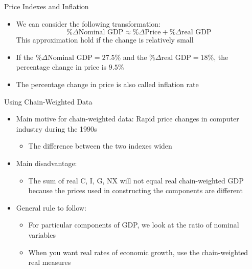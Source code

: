 \documentclass[aspectratio=1610]{beamer}
\begin{document}
\begin{frame}[wide]{Price Indexes and Inflation}
	\begin{itemize}
		\item We can consider the following transformation:
		\[\%\Delta \mbox{Nominal GDP} \approx \%\Delta \mbox{Price}+ \%\Delta \mbox{real GDP}\]
		This approximation hold if the change is relatively small
		\item If the $\%\Delta \mbox{Nominal GDP} = 27.5\%$ and the $\%\Delta \mbox{real GDP} = 18\%$, the percentage change in price is $9.5\%$
		\item The percentage change in price is also called inflation rate
	\end{itemize}
\end{frame}

\begin{frame}[wide]{Using Chain-Weighted Data}
	\begin{itemize}
		\item Main motive for chain-weighted data: Rapid price changes in computer industry during the 1990s
		\begin{itemize}
			\item The difference between the two indexes widen
		\end{itemize}
		\item Main disadvantage:
		\begin{itemize}
			\item The sum of real C, I, G, NX will not equal real chain-weighted GDP because the prices used in constructing the components are different
		\end{itemize}
		\item General rule to follow:
		\begin{itemize}
			\item For particular components of GDP, we look at the ratio of nominal variables
			\item When you want real rates of economic growth, use the chain-weighted real measures
		\end{itemize}
	\end{itemize}
\end{frame}
\end{document}
